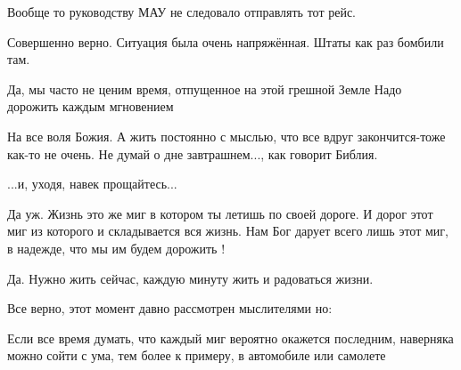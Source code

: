  
 
 
 
 
\zzSecCmt

\begin{itemize} %
Вообще то руководству МАУ не следовало отправлять тот рейс.

Совершенно верно. Ситуация была очень напряжённая. Штаты как раз бомбили там.

Да, мы часто не ценим время, отпущенное на этой грешной Земле
Надо дорожить каждым мгновением


На все воля Божия. А жить постоянно с мыслью, что все вдруг закончится-тоже
как-то не очень. Не думай о дне завтрашнем..., как говорит Библия.

...и, уходя, навек прощайтесь...


Да уж. Жизнь это же миг в котором ты летишь по своей дороге. И дорог этот миг
из которого и складывается вся жизнь. Нам Бог дарует всего лишь этот миг, в
надежде, что мы им будем дорожить !


Да. Нужно жить сейчас, каждую минуту жить и радоваться жизни.


Все верно, этот момент давно рассмотрен мыслителями но:

Если все время думать, что каждый миг вероятно окажется последним, наверняка
можно сойти с ума, тем более к примеру, в автомобиле или самолете

\end{itemize} %
